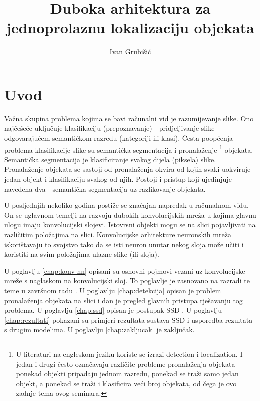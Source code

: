 \documentclass[utf8, diplomski, numeric, lmodern]{fer}
\begin{document}


\title{Duboka arhitektura za jednoprolaznu lokalizaciju objekata}

\author{Ivan Grubišić}

\maketitle

\thispagestyle{empty}
\clearpage
{
	\hypersetup{linkcolor=black}
	\tableofcontents
}



\chapter{Uvod}
Važna skupina problema kojima se bavi računalni vid je razumijevanje slike. Ono najčešeće uključuje klasifikaciju (prepoznavanje) - pridjeljivanje slike odgovarajućem semantičkom razredu (kategoriji ili klasi). Česta poopćenja problema klasifikacije slike su semantička segmentacija i pronalaženje \footnote{U literaturi na engleskom jeziku koriste se izrazi detection i localization. I jedan i drugi često	označavaju različite probleme pronalaženja objekata - ponekad objekti pripadaju jednom razredu, ponekad se traži samo jedan objekt, a ponekad se traži i klasificira veći broj objekata, od čega je ovo zadnje tema ovog seminara.} objekata. Semantička segmentacija je klasificiranje svakog dijela (piksela) slike. Pronalaženje objekata se sastoji od pronalaženja okvira od kojih svaki uokviruje jedan objekt i klasifikaciju svakog od njih. Postoji i pristup koji ujedinjuje navedena dva - semantička segmentacija uz razlikovanje objekata. 

U posljednjih nekoliko godina postiže se značajan napredak u računalnom vidu. On se uglavnom temelji na razvoju dubokih konvolucijskih mreža u kojima glavnu ulogu imaju konvolucijski slojevi. Istovrsni objekti mogu se na slici pojavljivati na različitim položajima na slici. Konvolucijske arhitekture neuronskih mreža iskorištavaju to svojstvo tako da se isti neuron unutar nekog sloja može učiti i koristiti na svim položajima ulazne slike (ili sloja).

U poglavlju \ref{chap:konv-nn} opisani su osnovni pojmovi vezani uz konvolucijske mreže s naglaskom na konvolucijski sloj. To poglavlje je zasnovano na razradi te teme u završnom radu \cite{semseg-ja}. U poglavlju \ref{chap:detekcija} opisan je problem pronalaženja objekata na slici i dan je pregled glavnih pristupa rješavanju tog problema. U poglavlju \ref{chap:ssd} opisan je postupak SSD \cite{ssd}. U poglavlju \ref{chap:rezultati} pokazani su primjeri rezultata sustava SSD i usporedba rezultata s drugim modelima. U poglavlju \ref{chap:zakljucak} je zaključak.
\end{document}
